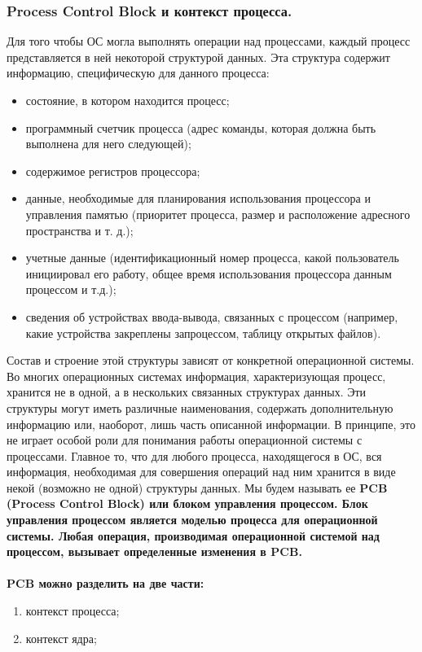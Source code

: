 \documentclass[a4paper]{article}
\begin{document}
\subsubsection{\Large Process Control Block и контекст процесса.}
Для того чтобы ОС могла выполнять операции над процессами, каждый процесс представляется в ней некоторой структурой данных. Эта структура содержит информацию, специфическую для данного процесса:
\begin{itemize}
  \item состояние, в котором находится процесс;
  \item программный счетчик процесса (адрес команды, которая должна быть выполнена для него следующей);
  \item содержимое регистров процессора;
  \item данные, необходимые для планирования использования процессора и управления памятью (приоритет процесса, размер и расположение адресного пространства и т. д.);
  \item учетные данные (идентификационный номер процесса, какой пользователь инициировал его работу, общее время использования процессора данным процессом и т.д.);
  \item сведения об устройствах ввода-вывода, связанных с процессом (например, какие устройства закреплены запроцессом, таблицу открытых файлов).
\end{itemize}
Состав и строение этой структуры зависят от конкретной операционной системы. Во многих операционных системах информация, характеризующая процесс, хранится не в одной, а в нескольких связанных структурах данных. Эти структуры могут иметь различные наименования, содержать дополнительную информацию или, наоборот, лишь часть описанной информации. В принципе, это не играет особой роли для понимания работы операционной системы с процессами. Главное то, что для любого процесса, находящегося в ОС, вся информация, необходимая для совершения операций над ним хранится в виде некой (возможно не одной) структуры данных. Мы будем называть ее \bf PCB \rm(Process Control Block) или блоком управления процессом. Блок управления процессом является моделью процесса для операционной системы. Любая операция, производимая операционной системой над процессом, вызывает определенные изменения в \bf PCB.\\\\
PCB \rm можно разделить на две части:
\begin{enumerate}
  \item контекст процесса;
  \item контекст ядра;
\end{enumerate}
\end{document}
